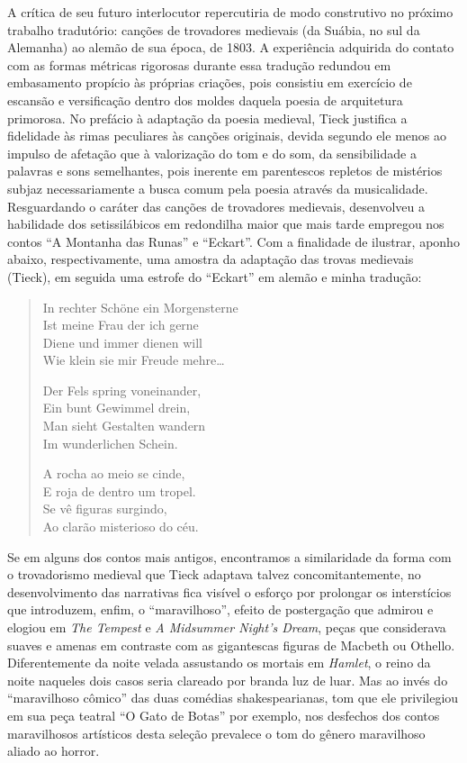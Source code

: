 A crítica de seu futuro interlocutor repercutiria de modo construtivo no
próximo trabalho tradutório: canções de trovadores medievais (da
Suábia, no sul da Alemanha) ao alemão de sua época, de 1803. A experiência
adquirida do contato com as formas métricas rigorosas durante essa
tradução redundou em embasamento propício às próprias criações, pois
consistiu em exercício de escansão e versificação dentro dos moldes
daquela poesia de arquitetura primorosa. No prefácio à adaptação da
poesia medieval, Tieck justifica a fidelidade às rimas peculiares às
canções originais, devida segundo ele menos ao impulso de afetação que
à valorização do tom e do som, da sensibilidade a palavras e sons
semelhantes, pois inerente em parentescos repletos de mistérios subjaz
necessariamente a busca comum pela poesia através da musicalidade.
Resguardando o caráter das canções de trovadores medievais, desenvolveu
a habilidade dos setissilábicos em redondilha maior que mais tarde
empregou nos contos ``A Montanha das Runas'' e ``Eckart''. Com a
finalidade de ilustrar, aponho abaixo, respectivamente, uma amostra da
adaptação das trovas medievais (Tieck), em seguida uma estrofe do
``Eckart'' em alemão e minha tradução:

\begin{verse}
In rechter Schöne ein Morgensterne\\
Ist meine Frau der ich gerne\\
Diene und immer dienen will\\
Wie klein sie mir Freude mehre\ldots{}

Der Fels spring voneinander,\\
Ein bunt Gewimmel drein,\\
Man sieht Gestalten wandern\\
Im wunderlichen Schein.

A rocha ao meio se cinde,\\
E roja de dentro um tropel.\\
Se vê figuras surgindo,\\
Ao clarão misterioso do céu.
\end{verse}

Se em alguns dos contos mais antigos, encontramos a similaridade da
forma com o trovadorismo medieval que Tieck adaptava talvez
concomitantemente, no desenvolvimento das narrativas fica visível o
esforço por prolongar os interstícios que introduzem, enfim, 
o ``maravilhoso'', efeito de postergação que admirou e elogiou em \textit{The Tempest} e
\textit{A Midsummer Night's Dream}, peças que considerava suaves e amenas em
contraste com as gigantescas figuras de Macbeth ou Othello.
Diferentemente da noite velada assustando os mortais em \textit{Hamlet}, o
reino da noite naqueles dois casos seria clareado por branda luz de
luar.  Mas ao invés do ``maravilhoso cômico'' das duas comédias
shakespearianas, tom que ele privilegiou em sua peça teatral ``O Gato de
Botas'' por exemplo, nos desfechos dos contos maravilhosos artísticos desta seleção
prevalece o tom do gênero maravilhoso aliado ao horror.  

